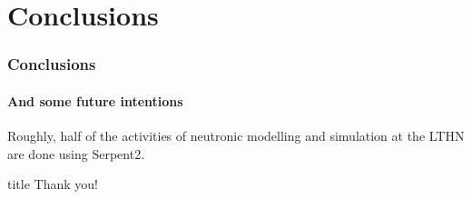 \documentclass[svgnames,smaller,table]{beamer}
\begin{document}

\section{Conclusions}
\begin{frame}
  \frametitle{Conclusions}
  \framesubtitle{And some future intentions}
  Roughly, half of the activities of neutronic modelling and simulation at the LTHN are done using Serpent2.
\end{frame}



\begin{frame}
 \vfill
  \begin{beamercolorbox}[center]{title}
     \Huge{Thank you!}
  \end{beamercolorbox}
  \vfill
\end{frame}
\end{document}
